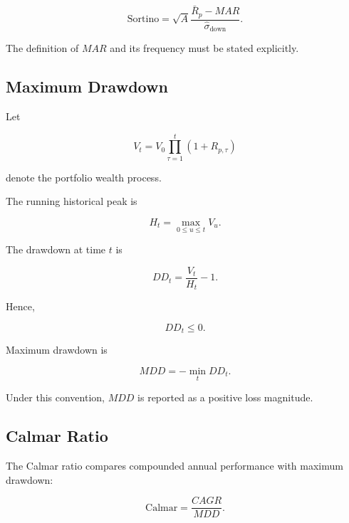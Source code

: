 \documentclass[11pt,a4paper]{article}
\begin{document}
\begin{equation}
\boxed{
\mathrm{Sortino}
=
\sqrt{A}
\frac{
\bar{R}_p-MAR
}{
\widehat{\sigma}_{\mathrm{down}}
}.
}
\end{equation}

The definition of $MAR$ and its frequency must be stated explicitly.


\subsection{Maximum Drawdown}

Let

\begin{equation}
V_t
=
V_0
\prod_{\tau=1}^{t}
(1+R_{p,\tau})
\end{equation}

denote the portfolio wealth process.

The running historical peak is

\begin{equation}
H_t
=
\max_{0\leq u\leq t}
V_u.
\end{equation}

The drawdown at time $t$ is

\begin{equation}
\boxed{
DD_t
=
\frac{V_t}{H_t}-1.
}
\end{equation}

Hence,

\begin{equation}
DD_t\leq0.
\end{equation}

Maximum drawdown is

\begin{equation}
\boxed{
MDD
=
-\min_t DD_t.
}
\end{equation}

Under this convention, $MDD$ is reported as a positive loss magnitude.


\subsection{Calmar Ratio}

The Calmar ratio compares compounded annual performance with maximum drawdown:

\begin{equation}
\boxed{
\mathrm{Calmar}
=
\frac{
CAGR
}{
MDD
}.
}
\end{equation}
\end{document}
